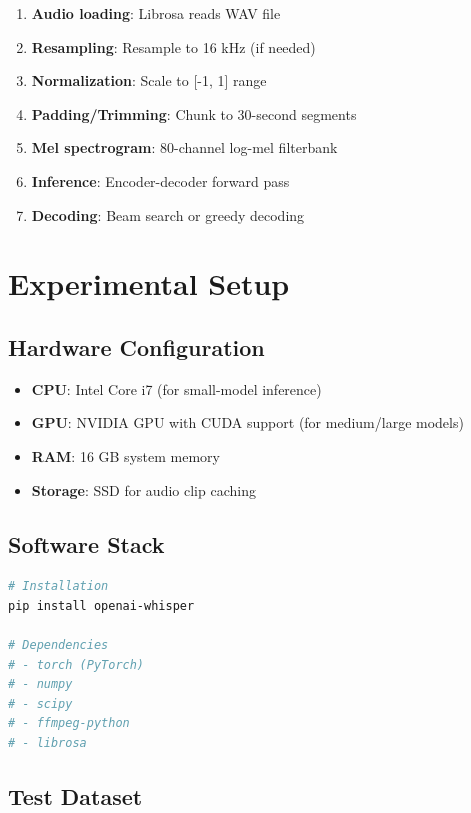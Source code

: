 \documentclass[11pt,a4paper]{article}
\begin{document}
\begin{enumerate}
    \item \textbf{Audio loading}: Librosa reads WAV file
    \item \textbf{Resampling}: Resample to 16 kHz (if needed)
    \item \textbf{Normalization}: Scale to [-1, 1] range
    \item \textbf{Padding/Trimming}: Chunk to 30-second segments
    \item \textbf{Mel spectrogram}: 80-channel log-mel filterbank
    \item \textbf{Inference}: Encoder-decoder forward pass
    \item \textbf{Decoding}: Beam search or greedy decoding
\end{enumerate}

\section{Experimental Setup}

\subsection{Hardware Configuration}

\begin{itemize}
    \item \textbf{CPU}: Intel Core i7 (for small-model inference)
    \item \textbf{GPU}: NVIDIA GPU with CUDA support (for medium/large models)
    \item \textbf{RAM}: 16 GB system memory
    \item \textbf{Storage}: SSD for audio clip caching
\end{itemize}

\subsection{Software Stack}

\begin{lstlisting}[language=Bash]
# Installation
pip install openai-whisper

# Dependencies
# - torch (PyTorch)
# - numpy
# - scipy
# - ffmpeg-python
# - librosa
\end{lstlisting}

\subsection{Test Dataset}
\end{document}

